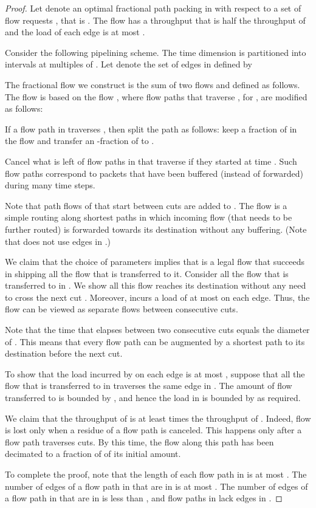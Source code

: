 \documentclass[11pt]{article}
\newenvironment{proof sketch}[1]{\noindent {\emph{Proof sketch of #1:}}}{\hfill \qed}
\begin{document}
\begin{proof}
  Let  denote an optimal fractional path packing in  with respect to a set of flow
  requests , that is .   The flow  has a
  throughput that is half the throughput of  and the load of each edge
  is at most .

  Consider the following pipelining scheme. The time dimension is partitioned into
  intervals at multiples of . Let  denote the set of edges in  defined by
  
  The fractional flow we construct is the sum of two flows  and 
  defined as follows.  The flow  is based on the flow ,
  where flow paths that traverse , for , are modified as
  follows:
  \begin{inparaenum}[(i)]
  \item If a flow path  in  traverses , then split the
    path  as follows: keep a fraction  of  in
    the flow  and transfer an -fraction of  to .
  \item Cancel what is left of flow paths in  that traverse
     if they started at time .
    Such flow paths correspond to packets that have been buffered
    (instead of forwarded) during many time steps.
  \end{inparaenum}
  Note that path flows of  that start between cuts are added
  to . The flow  is a simple routing along shortest paths in which incoming
  flow (that needs to be further routed) is forwarded towards its
  destination without any buffering. (Note that  does not use edges in .)

  We claim that the choice of parameters implies that  is a legal
  flow that succeeds in shipping all the flow that is transferred to
  it.  Consider all the flow that is transferred to  in .
  We show all this flow reaches its destination without any need to
  cross the next cut .  Moreover,  incurs a load of at
  most  on each edge. Thus, the flow  can be viewed as
  separate flows between consecutive cuts.

  Note that the time that elapses between two consecutive cuts equals
  the diameter of .  This means that every flow path can be
  augmented by a shortest path to its destination before the next cut.

  To show that the load incurred by  on each edge is at most ,
  suppose that all the flow that is transferred to  in 
  traverses the same edge in .  The amount of flow
  transferred to  is bounded by , and hence the load in  is bounded by  as required.

  We claim that the throughput of  is at least  times
  the throughput of . Indeed, flow is lost only when a residue
  of a flow path is canceled.  This happens only after a flow path
  traverses  cuts.  By this time, the flow along this
  path has been decimated to a fraction of  of its initial amount.

To complete the proof, note that the length of each flow path in 
is at most . The number of edges of a flow path
in  that are in  is at most . The number of edges of a flow path in 
that are in  is less than , and flow paths in  lack edges in .
\end{proof}
\end{document}
